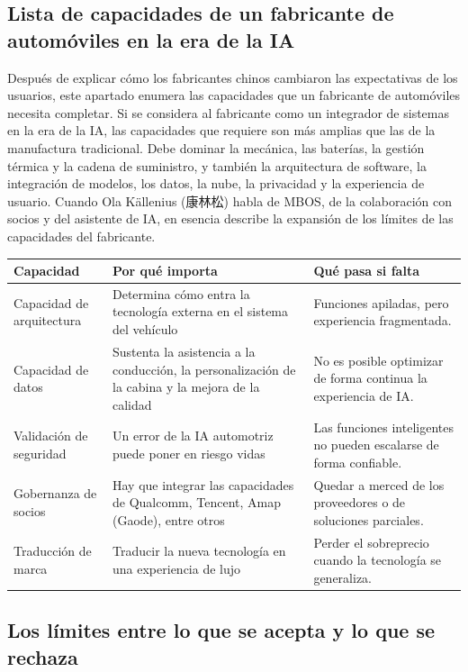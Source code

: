 \subsection{Lista de capacidades de un fabricante de automóviles en la era de la IA}

Después de explicar cómo los fabricantes chinos cambiaron las expectativas de los usuarios, este apartado enumera las capacidades que un fabricante de automóviles necesita completar. Si se considera al fabricante como un integrador de sistemas en la era de la IA, las capacidades que requiere son más amplias que las de la manufactura tradicional. Debe dominar la mecánica, las baterías, la gestión térmica y la cadena de suministro, y también la arquitectura de software, la integración de modelos, los datos, la nube, la privacidad y la experiencia de usuario. Cuando Ola Källenius (康林松) habla de MBOS, de la colaboración con socios y del asistente de IA, en esencia describe la expansión de los límites de las capacidades del fabricante.

\noindent\begin{tabularx}{\textwidth}{p{}p{}X}
\toprule
Capacidad & Por qué importa & Qué pasa si falta \\
\midrule
Capacidad de arquitectura & Determina cómo entra la tecnología externa en el sistema del vehículo & Funciones apiladas, pero experiencia fragmentada. \\
Capacidad de datos & Sustenta la asistencia a la conducción, la personalización de la cabina y la mejora de la calidad & No es posible optimizar de forma continua la experiencia de IA. \\
Validación de seguridad & Un error de la IA automotriz puede poner en riesgo vidas & Las funciones inteligentes no pueden escalarse de forma confiable. \\
Gobernanza de socios & Hay que integrar las capacidades de Qualcomm, Tencent, Amap (Gaode), entre otros & Quedar a merced de los proveedores o de soluciones parciales. \\
Traducción de marca & Traducir la nueva tecnología en una experiencia de lujo & Perder el sobreprecio cuando la tecnología se generaliza. \\
\bottomrule
\end{tabularx}

\subsection{Los límites entre lo que se acepta y lo que se rechaza}

